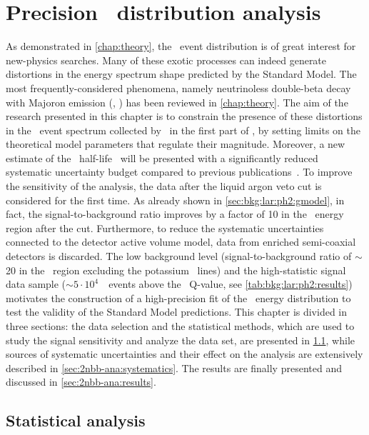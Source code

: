 
\chapter{\texorpdfstring{Precision \nnbb\ distribution analysis}{Precision 2νββ distribution analysis}}%
\label{chap:2nbb-ana}

As demonstrated in \cref{chap:theory}, the \nnbb\ event distribution is of great interest
for new-physics searches. Many of these exotic processes can indeed generate distortions
in the energy spectrum shape predicted by the Standard Model. The most
frequently-considered phenomena, namely neutrinoless double-beta decay with Majoron
emission (\onbbx, \onbbxx) has been reviewed in \cref{chap:theory}. The aim of the
research presented in this chapter is to constrain the presence of these distortions in
the \nnbb\ event spectrum collected by \gerda\ in the first part of \phasetwo, by setting
limits on the theoretical model parameters that regulate their magnitude. Moreover, a new
estimate of the \nnbb\ half-life \thalftwo\ will be presented with a significantly reduced
systematic uncertainty budget compared to previous publications~\cite{Agostini2015a}. To
improve the sensitivity of the analysis, the data after the liquid argon veto cut is
considered for the first time. As already shown in \cref{sec:bkg:lar:ph2:gmodel}, in fact,
the signal-to-background ratio improves by a factor of 10 in the \nnbb\ energy region
after the cut. Furthermore, to reduce the systematic uncertainties connected to the
detector active volume model, data from enriched semi-coaxial detectors is discarded. The
low background level (signal-to-background ratio of $\sim$20 in the \nnbb\ region
excluding the potassium \g\ lines) and the high-statistic signal data sample ($\sim$$5
\cdot 10^{4}$~\nnbb\ events above the \Arl\ Q-value, see \cref{tab:bkg:lar:ph2:results})
motivates the construction of a high-precision fit of the \nnbb\ energy distribution to
test the validity of the Standard Model predictions.
\newpar
This chapter is divided in three sections: the data selection and the statistical methods,
which are used to study the signal sensitivity and analyze the data set, are presented in
\cref{sec:2nbb-ana:stat}, while sources of systematic uncertainties and their effect on
the analysis are extensively described in \cref{sec:2nbb-ana:systematics}. The
results are finally presented and discussed in \cref{sec:2nbb-ana:results}.

\section{Statistical analysis}%
\label{sec:2nbb-ana:stat}

